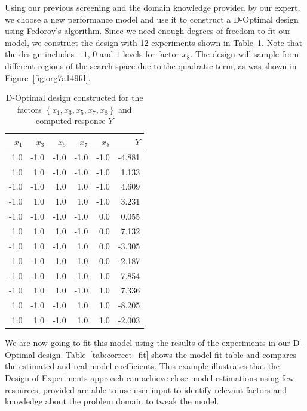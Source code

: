 \documentclass[conference]{IEEEtran}
\begin{document}
Using our previous screening and the domain knowledge provided by our expert, we
choose a new performance model and use it to construct a D-Optimal design using
Fedorov's algorithm. Since we need enough degrees of freedom to fit our model,
we construct the design with 12 experiments shown in Table~\ref{tab:d_optimal}.
Note that the design includes \(-1\), \(0\) and \(1\) levels for factor \(x_8\). The design
will sample from different regions of the search space due to the quadratic term,
as was shown in Figure~\ref{fig:org7a149fd}.

\begin{table}[ht]
\centering
\caption{D-Optimal design constructed for the factors $\left\{x_1,x_3,x_5,x_7,x_8\right\}$ and computed response $Y$}
\label{tab:d_optimal}
\begingroup\footnotesize
\begin{tabular}{rrrrrr}
  \toprule
$x_1$ & $x_3$ & $x_5$ & $x_7$ & $x_8$ & $Y$ \\
  \midrule
1.0 & -1.0 & -1.0 & -1.0 & -1.0 & -4.881 \\
  1.0 & 1.0 & -1.0 & -1.0 & -1.0 & 1.133 \\
  -1.0 & -1.0 & 1.0 & 1.0 & -1.0 & 4.609 \\
  -1.0 & 1.0 & 1.0 & 1.0 & -1.0 & 3.231 \\
  -1.0 & -1.0 & -1.0 & -1.0 & 0.0 & 0.055 \\
  1.0 & 1.0 & 1.0 & -1.0 & 0.0 & 7.132 \\
  -1.0 & 1.0 & -1.0 & 1.0 & 0.0 & -3.305 \\
  1.0 & -1.0 & 1.0 & 1.0 & 0.0 & -2.187 \\
  -1.0 & -1.0 & 1.0 & -1.0 & 1.0 & 7.854 \\
  -1.0 & 1.0 & 1.0 & -1.0 & 1.0 & 7.336 \\
  1.0 & -1.0 & -1.0 & 1.0 & 1.0 & -8.205 \\
  1.0 & 1.0 & -1.0 & 1.0 & 1.0 & -2.003 \\
   \bottomrule
\end{tabular}
\endgroup
\end{table}

We are now going to fit this model using the results of the experiments in our
D-Optimal design. Table~\ref{tab:correct_fit} shows the model fit table
and compares the estimated and real model coefficients. This example illustrates
that the Design of Experiments approach can achieve close model estimations
using few resources, provided are able to use user input to identify relevant
factors and knowledge about the problem domain to tweak the model.
\end{document}
